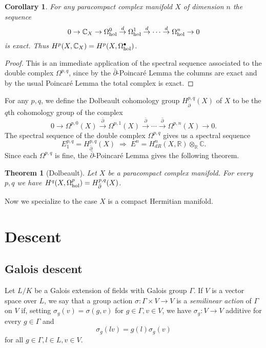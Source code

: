 \documentclass[letterpaper,11pt]{article}
\newtheorem{thm}{Theorem}
\newtheorem{cor}{Corollary}
\theoremstyle{definition}
\theoremstyle{remark}
\begin{document}
\begin{cor} For any paracompact complex manifold $X$ of dimension $n$ the sequence
\[
0 \rightarrow \mathbb{C}_X \rightarrow \Omega^0_{\rm hol} \stackrel{d}{\rightarrow} \Omega^1_{\rm hol} \stackrel{d}{\rightarrow} \cdots \stackrel{d}{\rightarrow} \Omega^n_{\rm hol} \rightarrow 0
\]
is exact. Thus $H^p(X,\mathbb{C}_X) = H^p(X,\Omega^\bullet_{\rm hol})$.
\end{cor}
\begin{proof} This is an immediate application of the spectral sequence associated to the double complex $\Omega^{p,q}$, since by the $\bar\partial$-Poincar\'{e} Lemma the columns are exact and by the usual Poincar\'{e} Lemma the total complex is exact.
\end{proof}

For any $p,q$, we define the Dolbeault cohomology group $H^{p,q}_{\bar\partial}(X)$ of $X$ to be the $q$th cohomology group of the complex
\[
0 \rightarrow \Omega^{p,0}(X) \stackrel{\bar\partial}{\rightarrow} \Omega^{p,1}(X) \stackrel{\bar\partial}{\rightarrow} \cdots \stackrel{\bar\partial}{\rightarrow} \Omega^{p,n}(X) \rightarrow 0.
\]
The spectral sequence of the double complex $\Omega^{p,q}$ gives us a spectral sequence
\[
E^{p,q}_1 = H^{p,q}_{\bar\partial}(X) \; \Rightarrow \; E^n = H^n_{dR}(X,\mathbb{R}) \otimes_\mathbb{R} \mathbb{C}.
\]
Since each $\Omega^{p,q}$ is fine, the $\bar\partial$-Poincar\'{e} Lemma gives the following theorem.

\begin{thm}[Dolbeault] Let $X$ be a paracompact complex manifold. For every $p,q$ we have $H^q(X,\Omega^p_{\rm hol}) = H^{p,q}_{\bar\partial}(X)$.
\end{thm}

Now we specialize to the case $X$ is a compact Hermitian manifold.

\section{Descent}

\subsection{Galois descent}

Let $L/K$ be a Galois extension of fields with Galois group $\Gamma$. If $V$ is a vector space over $L$, we say that a group action $\sigma:\Gamma\times V\rightarrow V$ is a \emph{semilinear action} of $\Gamma$ on $V$ if, setting $\sigma_g(v) = \sigma(g,v)$ for $g \in \Gamma, v\in V$, we have $\sigma_g : V \rightarrow V$ additive for every $g \in \Gamma$ and
\[
\sigma_g(lv) = g(l)\sigma_g(v)
\]
for all $g\in \Gamma, l \in L, v \in V$.
\end{document}
